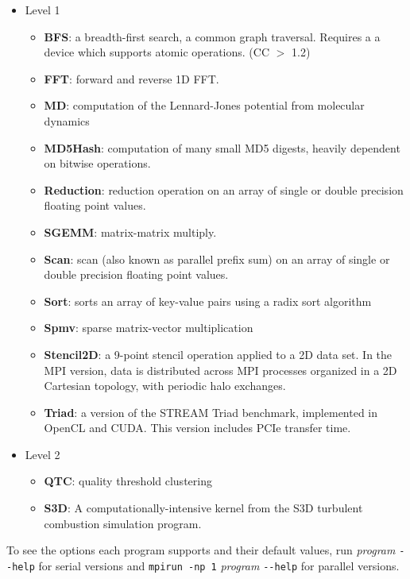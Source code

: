 \documentclass[11pt]{article}
\begin{document}
\begin{itemize}
\item Level 1
    \begin{itemize}
        \item {\bf BFS}: a breadth-first search, a common graph traversal. Requires a
        a device which supports atomic operations. (CC $>$ 1.2)
        \item {\bf FFT}: forward and reverse 1D FFT.
        \item {\bf MD}: computation of the Lennard-Jones potential from molecular dynamics
        \item {\bf MD5Hash}: computation of many small MD5 digests, heavily dependent on bitwise operations.
        \item {\bf Reduction}: reduction operation on an array of single
        or double precision floating point values.
        \item {\bf SGEMM}: matrix-matrix multiply.
        \item {\bf Scan}: scan (also known as parallel prefix sum) on an array 
        of single or double precision floating point values.
        \item {\bf Sort}: sorts an array of key-value pairs using a radix sort 
        algorithm
        \item {\bf Spmv}: sparse matrix-vector multiplication
        \item {\bf Stencil2D}: a 9-point stencil operation applied to a 2D data
        set. In the MPI version, data is distributed across MPI processes
        organized in a 2D Cartesian topology, with periodic halo exchanges.
        \item {\bf Triad}: a version of the STREAM Triad benchmark, implemented 
        in OpenCL and CUDA. This version includes PCIe transfer time.
    \end{itemize}
\item{Level 2}
    \begin{itemize}
        \item {\bf QTC}: quality threshold clustering
        \item {\bf S3D}: A computationally-intensive kernel from the 
        S3D turbulent combustion simulation program\cite{s3d}.
    \end{itemize}
\end{itemize}
    
To see the options each program supports and their default values, run 
{\it program} \verb+--help+ for serial versions and \verb+mpirun -np 1+ {\it program} \verb+--help+
for parallel versions.
\end{document}
